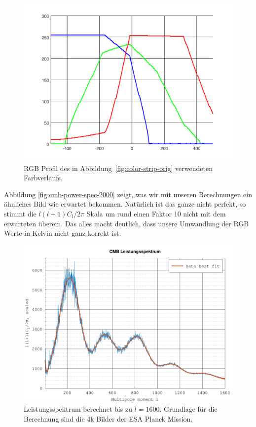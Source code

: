 \begin{figure}
	\centering
	\includegraphics[width=\linewidth]{cmb/converter/rgb-graph.pdf}
	\caption{RGB Profil des in Abbildung~\ref{fig:color-strip-orig} 
	verwendeten Farbverlaufs.}
	\label{fig:color-strip-orig-rgb}
\end{figure}

Abbildung \ref{fig:cmb-power-spec-2000} zeigt, was wir mit unseren Berechnungen 
ein ähnliches Bild wie erwartet bekommen. Natürlich ist das ganze nicht 
perfekt, so stimmt die $l(l+1)C_l/2\pi$ Skala um rund einen Faktor 10 nicht mit 
dem erwarteten überein. Das alles macht deutlich, dass unsere Umwandlung der 
RGB Werte in Kelvin nicht ganz korrekt ist.

\begin{figure}
	\centering
	\includegraphics[width=\linewidth]{cmb/data/4k1800-500.pdf}
	\caption{Leistungsspektrum berechnet bis zu $l = 1600$. Grundlage für die 
		Berechnung sind die 4k Bilder der ESA Planck Mission.}
	\label{fig:cmb-power-spec-1600}
\end{figure}

